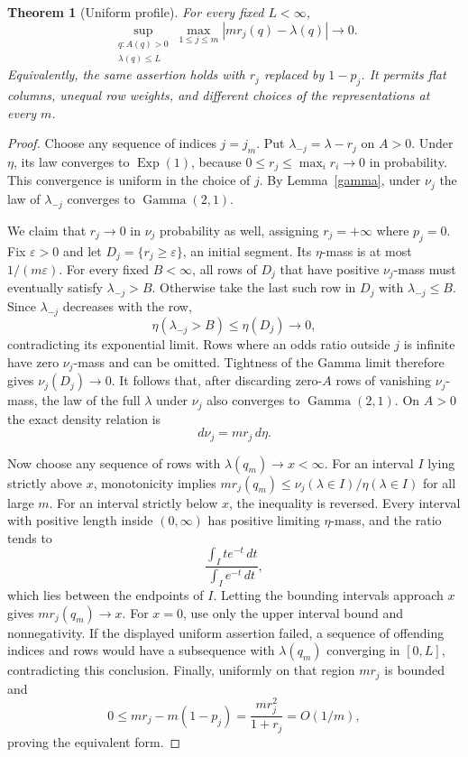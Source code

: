 \documentclass[11pt]{article}
\newtheorem{theorem}{Theorem}
\begin{document}
\begin{theorem}[Uniform profile]\label{profile}
For every fixed $L<\infty$,
\[
 \sup_{\substack{q:A(q)>0\\\lambda(q)\le L}}
 \max_{1\le j\le m}|m r_j(q)-\lambda(q)|\longrightarrow0.
\]
Equivalently, the same assertion holds with $r_j$ replaced by $1-p_j$.
It permits flat columns, unequal row weights, and different choices
of the representations at every $m$.
\end{theorem}
\begin{proof}
Choose any sequence of indices $j=j_m$. Put $\lambda_{-j}=\lambda-r_j$
on $A>0$. Under $\eta$, its law converges to $\operatorname{Exp}(1)$,
because $0\le r_j\le\max_i r_i\to0$ in probability. This convergence
is uniform in the choice of $j$.
By Lemma~\ref{gamma}, under $\nu_j$ the law of $\lambda_{-j}$ converges
to $\operatorname{Gamma}(2,1)$.

We claim that $r_j\to0$ in $\nu_j$ probability as well, assigning
$r_j=+\infty$ where $p_j=0$. Fix $\varepsilon>0$ and let
$D_j=\{r_j\ge\varepsilon\}$, an initial segment. Its $\eta$-mass is
at most $1/(m\varepsilon)$. For every fixed $B<\infty$, all rows of
$D_j$ that have positive $\nu_j$-mass must eventually satisfy
$\lambda_{-j}>B$. Otherwise take the last such row in $D_j$ with
$\lambda_{-j}\le B$. Since $\lambda_{-j}$ decreases with the row,
\[
 \eta(\lambda_{-j}>B)\le\eta(D_j)\longrightarrow0,
\]
contradicting its exponential limit. Rows where an odds ratio outside
$j$ is infinite have zero $\nu_j$-mass and can be omitted.
Tightness of the Gamma limit therefore gives
$\nu_j(D_j)\to0$. It follows that, after discarding zero-$A$ rows of
vanishing $\nu_j$-mass, the law of the full $\lambda$ under $\nu_j$
also converges to $\operatorname{Gamma}(2,1)$.
On $A>0$ the exact density relation is
\[
 d\nu_j=m r_j\,d\eta.
\]

Now choose any sequence of rows with $\lambda(q_m)\to x<\infty$.
For an interval $I$ lying strictly above $x$, monotonicity implies
$m r_j(q_m)\le\nu_j(\lambda\in I)/\eta(\lambda\in I)$ for all large
$m$. For an interval strictly below $x$, the inequality is reversed.
Every interval with positive length inside $(0,\infty)$ has positive
limiting $\eta$-mass, and the ratio tends to
\[
 \frac{\int_I t e^{-t}\,dt}{\int_I e^{-t}\,dt},
\]
which lies between the endpoints of $I$. Letting the bounding intervals
approach $x$ gives $m r_j(q_m)\to x$. For $x=0$, use only the upper
interval bound and nonnegativity.
If the displayed uniform assertion failed, a sequence of offending
indices and rows would have a subsequence with $\lambda(q_m)$ converging
in $[0,L]$, contradicting this conclusion.
Finally, uniformly on that region $m r_j$ is bounded and
\[
 0\le m r_j-m(1-p_j)=\frac{m r_j^2}{1+r_j}=O(1/m),
\]
proving the equivalent form.
\end{proof}
\end{document}

